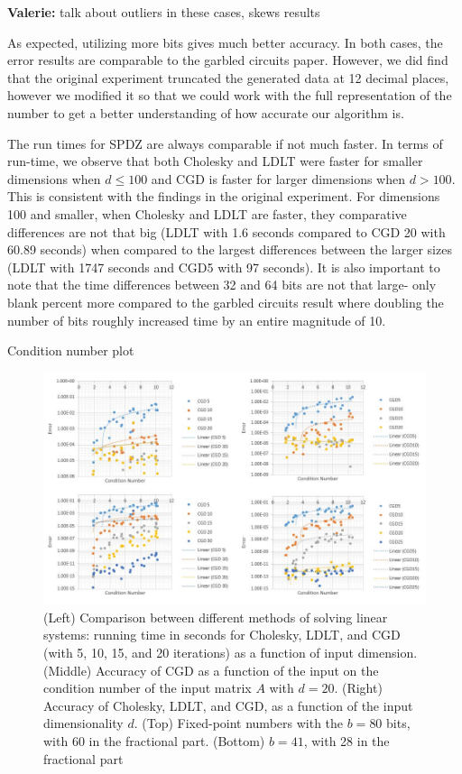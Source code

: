 \documentclass{article}
\theoremstyle{plain}
\theoremstyle{definition}
\theoremstyle{remark}
\newcommand{\vc}[1]{{\textcolor{lred}{\textbf{Valerie:} #1}}}
\begin{document}
\vc{talk about outliers in these cases, skews results}

As expected, utilizing more bits gives much better accuracy. In both cases, the error results are comparable to the garbled circuits paper. However, we did find that the original experiment truncated the generated data at 12 decimal places, however we modified it so that we could work with the full representation of the number to get a better understanding of how accurate our algorithm is.  

The run times for SPDZ are always comparable if not much faster. In terms of run-time, we observe that both Cholesky and LDLT were faster for smaller dimensions when $d \leq 100$ and CGD is faster for larger dimensions when $d > 100$. This is consistent with the findings in the original experiment. For dimensions 100 and smaller, when Cholesky and LDLT are faster, they comparative differences are not that big (LDLT with 1.6 seconds compared to CGD 20 with 60.89 seconds) when compared to the largest differences between the larger sizes (LDLT with 1747 seconds and CGD5 with 97 seconds). It is also important to note that the time differences between 32 and 64 bits are not that large- only blank percent more compared to the garbled circuits result where doubling the number of bits roughly increased time by an entire magnitude of 10.  

Condition number plot
\begin{figure}[h]
  \includegraphics[width=\linewidth]{conditionnumber.jpg}
  \caption{(Left) Comparison between different methods of solving linear systems: running time in seconds for Cholesky, LDLT, and CGD (with 5, 10, 15, and 20 iterations) as a function of input dimension. (Middle) Accuracy of CGD as a function of the input on the condition number of the input matrix $A$ with $d = 20$. (Right) Accuracy of Cholesky, LDLT, and CGD, as a function of the input dimensionality $d$. (Top) Fixed-point numbers with the $b = 80$ bits, with 60 in the fractional part. (Bottom) $b = 41$, with 28 in the fractional part}
  \label{fig:result3}
\end{figure}
\end{document}
